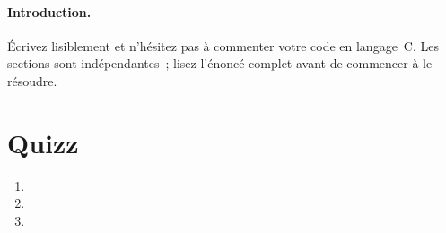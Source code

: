 \documentclass[ds]{sujet}
\begin{document}
\formation{} 
\matiere{}  
\auteur{} 
\paragraph{Introduction.}
\'Ecrivez lisiblement et n'h\'esitez pas \`a commenter votre code en
langage~C. Les sections sont ind\'ependantes~; lisez l'\'enonc\'e
complet avant de commencer \`a le r\'esoudre.
\section{Quizz}
\begin{enumerate}
 \item
 \item
 \item
\end{enumerate}



\end{document}
